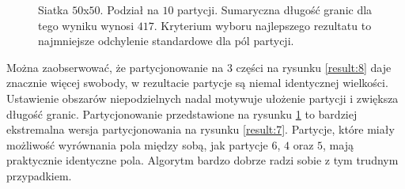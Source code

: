 \begin{figure}[h]
\begin{subfigure}{.33\textwidth}
    \caption[short]{}
\end{subfigure}
\caption{Siatka $50$x$50$. Podział na $10$ partycji. Sumaryczna długość granic dla tego wyniku wynosi $417$.
Kryterium wyboru najlepszego rezultatu to najmniejsze odchylenie standardowe dla pól partycji.}
\label{result:9}
\end{figure}

Można zaobserwować, że partycjonowanie na $3$ części na rysunku \ref{result:8} daje znacznie więcej swobody, w rezultacie
partycje są niemal identycznej wielkości.
Ustawienie obszarów niepodzielnych nadal motywuje ułożenie partycji i zwiększa długość granic.
Partycjonowanie przedstawione na rysunku \ref{result:9} to bardziej ekstremalna wersja partycjonowania na rysunku \ref{result:7}.
Partycje, które miały możliwość wyrównania pola między sobą, jak partycje $6$, $4$ oraz $5$,
mają praktycznie identyczne pola.
Algorytm bardzo dobrze radzi sobie z tym trudnym przypadkiem.

\vspace{4mm}

